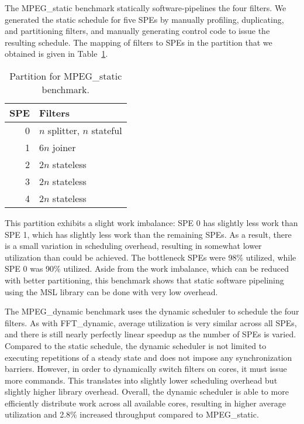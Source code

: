The \textsf{MPEG\_static} benchmark statically software-pipelines the four filters.
We generated the static schedule for five SPEs by manually profiling, duplicating, and
partitioning filters, and manually generating control code to issue the resulting schedule.
The mapping of filters to SPEs in the partition that we obtained is given in
Table~\ref{fig:perf:mpegs}.

\begin{table}[!htb]
\begin{center}
\begin{tabular}{|r|l|}
\hline
SPE & Filters \\
\hline
0 & $n$ splitter, $n$ stateful \\
\hline
1 & $6n$ joiner \\
\hline
2 & $2n$ stateless \\
\hline
3 & $2n$ stateless \\
\hline
4 & $2n$ stateless \\
\hline
\end{tabular}
\end{center}
\caption{Partition for \textsf{MPEG\_static} benchmark.}
\label{fig:perf:mpegs}
\end{table}

This partition exhibits a slight work imbalance: SPE 0 has slightly less work than SPE 1,
which has slightly less work than the remaining SPEs.
As a result, there is a small variation in scheduling overhead, resulting in somewhat lower
utilization than could be achieved.
The bottleneck SPEs were 98\% utilized, while SPE 0 was 90\% utilized.
Aside from the work imbalance, which can be reduced with better partitioning,
this benchmark shows that static software pipelining using the MSL library can be done
with very low overhead.

The \textsf{MPEG\_dynamic} benchmark uses the dynamic scheduler to schedule the four filters.
As with \textsf{FFT\_dynamic}, average utilization is very similar across all SPEs,
and there is still nearly perfectly linear speedup as the number of SPEs is varied.
Compared to the static schedule, the dynamic scheduler is not limited to executing
repetitions of a steady state and does not impose any synchronization barriers.
However, in order to dynamically switch filters on cores, it must issue more commands.
This translates into slightly lower scheduling overhead but slightly higher library overhead.
Overall, the dynamic scheduler is able to more efficiently distribute work across
all available cores, resulting in higher average utilization and 2.8\% increased throughput
compared to \textsf{MPEG\_static}.

